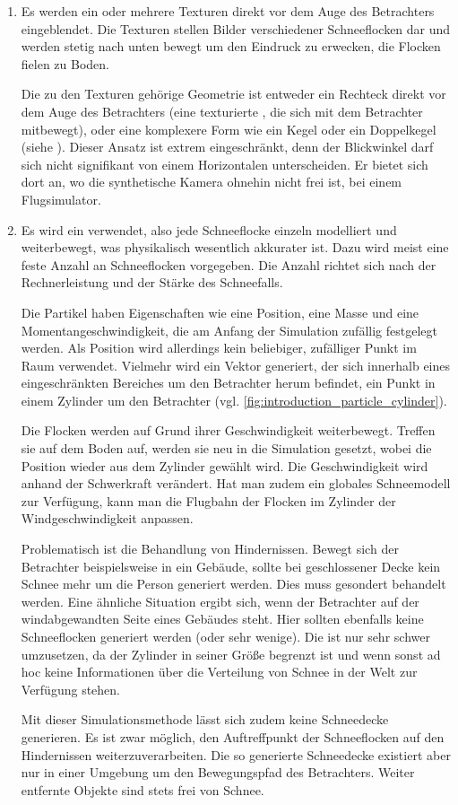 \begin{enumerate}
\item Es werden ein oder mehrere Texturen direkt vor dem Auge des
Betrachters eingeblendet. Die Texturen stellen Bilder verschiedener
Schneeflocken dar und werden stetig nach unten bewegt um den Eindruck
zu erwecken, die Flocken fielen zu Boden.

Die zu den Texturen gehörige Geometrie ist entweder ein Rechteck
direkt vor dem Auge des Betrachters (eine texturierte
, die sich mit dem Betrachter mitbewegt),
oder eine komplexere Form wie ein Kegel oder ein Doppelkegel (siehe
\cite{Wang2004}). Dieser Ansatz ist extrem eingeschränkt, denn der
Blickwinkel darf sich nicht signifikant von einem Horizontalen
unterscheiden. Er bietet sich dort an, wo die synthetische Kamera
ohnehin nicht frei ist, \PimiddyzB bei einem Flugsimulator.
\item Es wird ein 
verwendet\cite{Reeves:1983:PST:357318.357320}, also jede Schneeflocke
einzeln modelliert und weiterbewegt, was physikalisch wesentlich
akkurater ist. Dazu wird meist eine feste Anzahl an Schneeflocken
vorgegeben. Die Anzahl richtet sich nach der Rechnerleistung und der
Stärke des Schneefalls.

Die Partikel haben Eigenschaften wie eine Position, eine Masse und
eine Momentangeschwindigkeit, die am Anfang der Simulation zufällig
festgelegt werden. Als Position wird allerdings kein beliebiger,
zufälliger Punkt im Raum verwendet. Vielmehr wird ein Vektor
generiert, der sich innerhalb eines eingeschränkten Bereiches um den
Betrachter herum befindet, \PimiddyzB ein Punkt in einem Zylinder um
den Betrachter (vgl. \autoref{fig:introduction_particle_cylinder}).

Die Flocken werden auf Grund ihrer Geschwindigkeit
weiterbewegt. Treffen sie auf dem Boden auf, werden sie neu in die
Simulation gesetzt, wobei die Position wieder aus dem Zylinder gewählt
wird. Die Geschwindigkeit wird anhand der Schwerkraft verändert.  Hat
man zudem ein globales Schneemodell zur Verfügung, kann man die
Flugbahn der Flocken im Zylinder der Windgeschwindigkeit anpassen.

Problematisch ist die Behandlung von Hindernissen. Bewegt sich der
Betrachter beispielsweise in ein Gebäude, sollte bei geschlossener
Decke kein Schnee mehr um die Person generiert werden. Dies muss
gesondert behandelt werden. Eine ähnliche Situation ergibt sich, wenn
der Betrachter auf der windabgewandten Seite eines Gebäudes
steht. Hier sollten ebenfalls keine Schneeflocken generiert werden
(oder sehr wenige). Die ist nur sehr schwer umzusetzen, da der
Zylinder in seiner Größe begrenzt ist und wenn sonst ad hoc keine
Informationen über die Verteilung von Schnee in der Welt zur Verfügung
stehen.

Mit dieser Simulationsmethode lässt sich zudem keine Schneedecke
generieren. Es ist zwar möglich, den Auftreffpunkt der Schneeflocken
auf den Hindernissen weiterzuverarbeiten. Die so generierte
Schneedecke existiert aber nur in einer Umgebung um den Bewegungspfad
des Betrachters. Weiter entfernte Objekte sind stets frei von
Schnee.
\end{enumerate}

